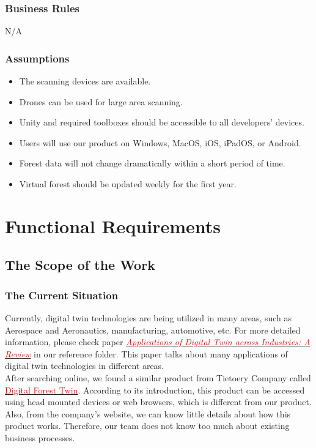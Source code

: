 \documentclass{article}
\begin{document}
\subsubsection{Business Rules}
N/A
\subsubsection{Assumptions}
\begin{itemize}
    \item The scanning devices are available.
    \item Drones can be used for large area scanning.
    \item Unity and required toolboxes 
    should be accessible to all developers'
    devices.
    \item Users will use our product on Windows, MacOS, iOS, iPadOS,
    or Android.
    \item Forest data will not change dramatically within a 
    short period of time. 
    \item Virtual forest should be updated weekly for the 
    first year.
\end{itemize}


\section{Functional Requirements}
\subsection{The Scope of the Work}
\subsubsection{The Current Situation}
Currently, digital twin technologies are being utilized in many
areas, such as Aerospace and Aeronautics, manufacturing, automotive, etc. For more detailed information, please check paper \href{https://github.com/wuj187/DigitalTwinCAS/blob/main/refs/DT_Applications.pdf}{\textcolor{red}{\textit{Applications of Digital Twin across 
Industries: A Review}}} in our reference folder. This paper talks about 
many applications of digital twin technologies in different areas.\\
After searching online, we found a similar product from Tietoery
Company called \href{https://www.tietoevry.com/en/industries/forest-pulp-paper-and-fibre/forest-solutions/wood-and-fibre-ecosystem-and-integration/digital-forest-twin/}{\textcolor{red}{Digital Forest Twin}}.
According to its introduction, this product can 
be accessed using head mounted devices or
web browsers, which is different from our product. Also, 
from the company's website, we can know little details about how
 this product works. Therefore, our team does not know too much
 about existing business processes.
 \newpage
\end{document}
